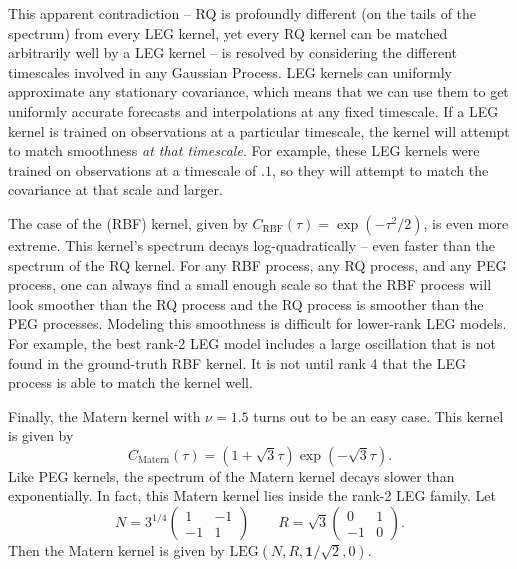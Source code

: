 \documentclass{article}
\theoremstyle{definition}
\newcommand{\LEG}{\mathrm{LEG}}
\begin{document}
This apparent contradiction -- RQ is profoundly different (on the tails of the spectrum) from every LEG kernel, yet every RQ kernel can be matched arbitrarily well by a LEG kernel -- is resolved by considering the different timescales involved in any Gaussian Process.  LEG kernels can uniformly approximate any stationary covariance, which means that we can use them to get uniformly accurate forecasts and interpolations at any fixed timescale.  If a LEG kernel is trained on observations at a particular timescale, the kernel will attempt to match smoothness \emph{at that timescale}.  For example, these LEG kernels were trained on observations at a timescale of $.1$, so they will attempt to match the covariance at that scale and larger.


The case of the (RBF) kernel, given by $C_\mathrm{RBF}(\tau)=\exp(-\tau^2/2)$, is even more extreme.  This kernel's spectrum decays log-quadratically -- even faster than the spectrum of the RQ kernel.  For any RBF process, any RQ process, and any PEG process, one can always find a small enough scale so that the RBF process will look smoother than the RQ process and the RQ process is smoother than the PEG processes.  Modeling this smoothness is difficult for lower-rank LEG models.  For example, the best rank-2 LEG model includes a large oscillation that is not found in the ground-truth RBF kernel.  It is not until rank 4 that the LEG process is able to match the kernel well.

Finally, the Matern kernel with $\nu=1.5$ turns out to be an easy case.  This kernel is given by 
\[
C_{\mathrm{Matern}}(\tau) = (1+\sqrt{3}\tau)\exp(-\sqrt{3}\tau).
\]
Like PEG kernels, the spectrum of the Matern kernel decays slower than exponentially.  In fact, this Matern kernel lies inside the rank-2 LEG family.  Let
\[
N=3^{1/4}\left(\begin{array}{cc}
1 & -1\\
-1 & 1
\end{array}\right)\qquad R=\sqrt{3}\left(\begin{array}{cc}
0 & 1\\
-1 & 0
\end{array}\right).
\]
Then the Matern kernel is given by $\LEG(N,R,\mathbf{1}/\sqrt{2},0)$.
\end{document}
